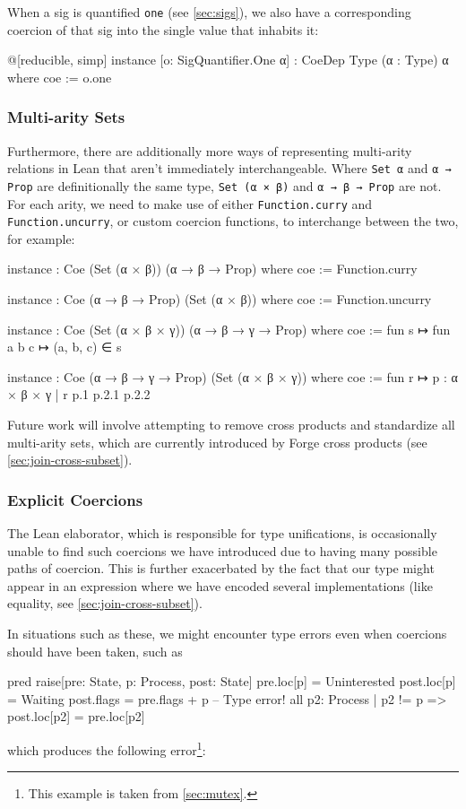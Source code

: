 When a sig is quantified \texttt{one} (see \cref{sec:sigs}), we also have a corresponding coercion of that sig into the single value that inhabits it: 
\begin{leanimpl*}
@[reducible, simp] instance [o: SigQuantifier.One α] : CoeDep Type (α : Type) α where
  coe := o.one
\end{leanimpl*}

\subsubsection{Multi-arity Sets}

Furthermore, there are additionally more ways of representing multi-arity relations in Lean that aren't immediately interchangeable. Where \texttt{Set α} and \texttt{α → Prop} are definitionally the same type, \texttt{Set (α × β)} and \texttt{α → β → Prop} are not. For each arity, we need to make use of either \texttt{Function.curry} and \texttt{Function.uncurry}, or custom coercion functions, to interchange between the two, for example: 
\begin{leanimpl*}
instance : Coe (Set (α × β)) (α → β → Prop) where
  coe := Function.curry

instance : Coe (α → β → Prop) (Set (α × β)) where
  coe := Function.uncurry

instance : Coe (Set (α × β × γ)) (α → β → γ → Prop) where
  coe := fun s ↦ fun a b c ↦ (a, b, c) ∈ s

instance : Coe (α → β → γ → Prop) (Set (α × β × γ)) where
  coe := fun r ↦ {p : α × β × γ | r p.1 p.2.1 p.2.2}
\end{leanimpl*}
Future work will involve attempting to remove cross products and standardize all multi-arity sets, which are currently introduced by Forge cross products (see \cref{sec:join-cross-subset}). 

\subsubsection{Explicit Coercions}

The Lean elaborator, which is responsible for type unifications, is occasionally unable to find such coercions we have introduced due to having many possible paths of coercion. This is further exacerbated by the fact that our type might appear in an expression where we have encoded several implementations (like equality, see \cref{sec:join-cross-subset}). 

In situations such as these, we might encounter type errors even when coercions should have been taken, such as 
\begin{forge*}
pred raise[pre: State, p: Process, post: State] {
  pre.loc[p] = Uninterested
  post.loc[p] = Waiting
  post.flags = pre.flags + p -- Type error!
  all p2: Process | p2 != p => post.loc[p2] = pre.loc[p2]
}
\end{forge*}
which produces the following error\footnote{This example is taken from \cref{sec:mutex}.}:

